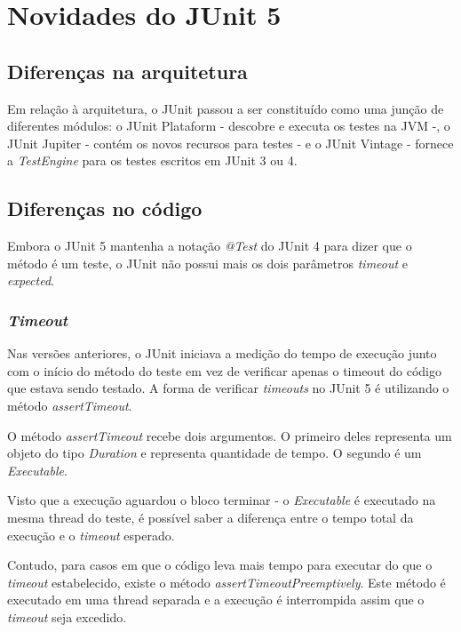 \section{Novidades do JUnit 5}
    \subsection{Diferenças na arquitetura}
        Em relação à arquitetura, o JUnit passou a ser constituído como uma junção de diferentes módulos: o JUnit Plataform - descobre e executa os testes na JVM -, o JUnit Jupiter - contém os novos recursos para testes - e o JUnit Vintage - fornece a \textit{TestEngine} para os testes escritos em JUnit 3 ou 4.

    \subsection{Diferenças no código}
        \par Embora o JUnit 5 mantenha a notação \textit{@Test} do JUnit 4 para dizer que o método é um teste, o JUnit não possui mais os dois parâmetros \textit{timeout} e \textit{expected}.
        \subsubsection{\textit{Timeout}}
        \par Nas versões anteriores, o JUnit iniciava a medição do tempo de execução junto com o início do método do teste em vez de verificar apenas o timeout do código que estava sendo testado. A forma de verificar \textit{timeouts} no JUnit 5 é utilizando o método \textit{assertTimeout}.  
        \newline
        \par O método \textit{assertTimeout} recebe dois argumentos. O primeiro deles representa um objeto do tipo \textit{Duration} e representa quantidade de tempo. O segundo é um \textit{Executable}.
        \newline
        \par Visto que a execução aguardou o bloco terminar - o \textit{Executable} é executado na mesma thread do teste, é possível saber a diferença entre o tempo total da execução e o \textit{timeout} esperado.
        \newline
        \par Contudo, para casos em que o código leva mais tempo para executar do que o \textit{timeout} estabelecido, existe o método \textit{assertTimeoutPreemptively}. Este método é executado em uma thread separada e a execução é interrompida assim que o \textit{timeout} seja excedido.
